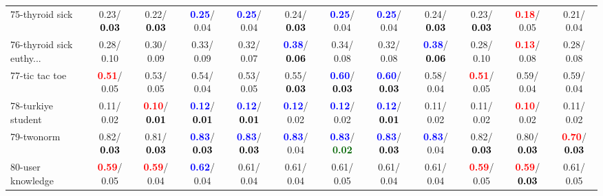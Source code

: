 \begin{table}[h]
\begin{center}
{\begin{tabular}{lc|c|c|c|c|c|c|c|c|c|c}
75-thyroid sick &   0.23/\textcolor{black}{\textbf{  0.03}} &   0.22/\textcolor{black}{\textbf{  0.03}} & \textcolor{blue}{\textbf{  0.25}}/  0.04 & \textcolor{blue}{\textbf{  0.25}}/  0.04 &   0.24/\textcolor{black}{\textbf{  0.03}} & \textcolor{blue}{\textbf{  0.25}}/  0.04 & \textcolor{blue}{\textbf{  0.25}}/  0.04 &   0.24/\textcolor{black}{\textbf{  0.03}} &   0.23/\textcolor{black}{\textbf{  0.03}} & \textcolor{red}{\textbf{  0.18}}/  0.05 &   0.21/  0.04 \\
76-thyroid sick euthy... &   0.28/  0.10 &   0.30/  0.09 &   0.33/  0.09 &   0.32/  0.07 & \textcolor{blue}{\textbf{  0.38}}/\textcolor{black}{\textbf{  0.06}} &   0.34/  0.08 &   0.32/  0.08 & \textcolor{blue}{\textbf{  0.38}}/\textcolor{black}{\textbf{  0.06}} &   0.28/  0.10 & \textcolor{red}{\textbf{  0.13}}/  0.08 &   0.28/  0.08 \\
77-tic tac toe & \textcolor{red}{\textbf{  0.51}}/  0.05 &   0.53/  0.05 &   0.54/  0.04 &   0.53/  0.05 &   0.55/\textcolor{black}{\textbf{  0.03}} & \textcolor{blue}{\textbf{  0.60}}/\textcolor{black}{\textbf{  0.03}} & \textcolor{blue}{\textbf{  0.60}}/\textcolor{black}{\textbf{  0.03}} &   0.58/  0.04 & \textcolor{red}{\textbf{  0.51}}/  0.05 &   0.59/  0.04 &   0.59/  0.04 \\
78-turkiye student &   0.11/  0.02 & \textcolor{red}{\textbf{  0.10}}/\textcolor{black}{\textbf{  0.01}} & \textcolor{blue}{\textbf{  0.12}}/\textcolor{black}{\textbf{  0.01}} & \textcolor{blue}{\textbf{  0.12}}/\textcolor{black}{\textbf{  0.01}} & \textcolor{blue}{\textbf{  0.12}}/  0.02 & \textcolor{blue}{\textbf{  0.12}}/  0.02 & \textcolor{blue}{\textbf{  0.12}}/\textcolor{black}{\textbf{  0.01}} &   0.11/  0.02 &   0.11/  0.02 & \textcolor{red}{\textbf{  0.10}}/  0.02 &   0.11/  0.02 \\ \hline
79-twonorm &   0.82/\textcolor{black}{\textbf{  0.03}} &   0.81/\textcolor{black}{\textbf{  0.03}} & \textcolor{blue}{\textbf{  0.83}}/\textcolor{black}{\textbf{  0.03}} & \textcolor{blue}{\textbf{  0.83}}/\textcolor{black}{\textbf{  0.03}} & \textcolor{blue}{\textbf{  0.83}}/  0.04 & \textcolor{blue}{\textbf{  0.83}}/\textcolor{darkgreen}{\textbf{  0.02}} & \textcolor{blue}{\textbf{  0.83}}/\textcolor{black}{\textbf{  0.03}} & \textcolor{blue}{\textbf{  0.83}}/  0.04 &   0.82/\textcolor{black}{\textbf{  0.03}} &   0.80/\textcolor{black}{\textbf{  0.03}} & \textcolor{red}{\textbf{  0.70}}/\textcolor{black}{\textbf{  0.03}} \\
80-user knowledge & \textcolor{red}{\textbf{  0.59}}/  0.05 & \textcolor{red}{\textbf{  0.59}}/  0.04 & \textcolor{blue}{\textbf{  0.62}}/  0.04 &   0.61/  0.04 &   0.61/  0.04 &   0.61/  0.05 &   0.61/  0.04 &   0.61/  0.04 & \textcolor{red}{\textbf{  0.59}}/  0.05 & \textcolor{red}{\textbf{  0.59}}/\textcolor{black}{\textbf{  0.03}} &   0.61/  0.05 \\

\end{tabular}}
\end{center}
\end{table}
